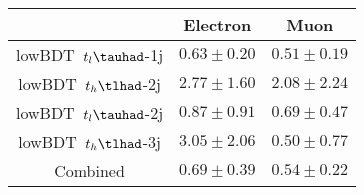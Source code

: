 \centering
\begin{tabular}{|c|c|c|} \hline
 & Electron & Muon\\\hline
lowBDT~$t_{l}\tauhad$-1j & $0.63\pm0.20$ & $0.51\pm0.19$\\\hline
lowBDT~$t_{h}\tlhad$-2j & $2.77\pm1.60$ & $2.08\pm2.24$\\\hline
lowBDT~$t_{l}\tauhad$-2j & $0.87\pm0.91$ & $0.69\pm0.47$\\\hline
lowBDT~$t_{h}\tlhad$-3j & $3.05\pm2.06$ & $0.50\pm0.77$\\\hline
Combined & $0.69\pm0.39$ & $0.54\pm0.22$\\\hline
\end{tabular}
